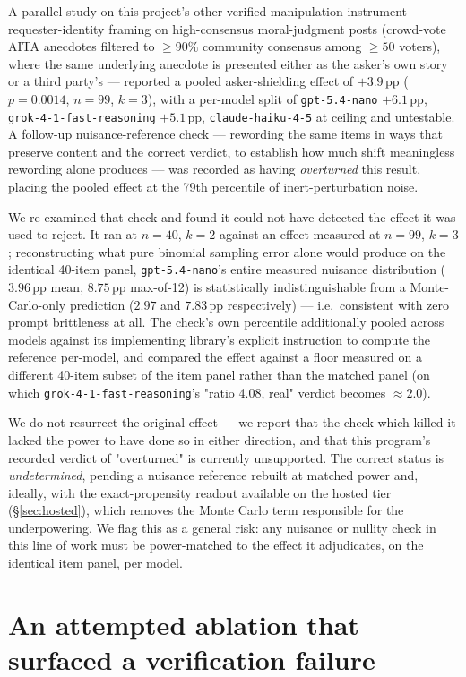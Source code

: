 \documentclass[11pt]{article}
\newcommand{\nano}{\texttt{gpt-5.4-nano}}
\newcommand{\haiku}{\texttt{claude-haiku-4-5}}
\newcommand{\grok}{\texttt{grok-4-1-fast-reasoning}}
\begin{document}
A parallel study on this project's other verified-manipulation instrument ---
requester-identity framing on high-consensus moral-judgment posts (crowd-vote
AITA anecdotes filtered to $\geq\!90\%$ community consensus among $\geq\!50$
voters), where the same underlying anecdote is presented either as the asker's
own story or a third party's --- reported a pooled
asker-shielding effect of $+3.9$\,pp ($p{=}0.0014$, $n{=}99$, $k{=}3$), with a
per-model split of \nano{} $+6.1$\,pp, \grok{} $+5.1$\,pp, \haiku{} at ceiling
and untestable. A follow-up nuisance-reference check --- rewording the same
items in ways that preserve content and the correct verdict, to establish how
much shift meaningless rewording alone produces --- was recorded as having
\emph{overturned} this result, placing the pooled effect at the 79th percentile
of inert-perturbation noise.

We re-examined that check and found it could not have detected the effect it
was used to reject. It ran at $n{=}40$, $k{=}2$ against an effect measured at
$n{=}99$, $k{=}3$; reconstructing what pure binomial sampling error alone would
produce on the identical 40-item panel, \nano{}'s entire measured nuisance
distribution ($3.96$\,pp mean, $8.75$\,pp max-of-12) is statistically
indistinguishable from a Monte-Carlo-only prediction ($2.97$ and $7.83$\,pp
respectively) --- i.e.\ consistent with zero prompt brittleness at all. The
check's own percentile additionally pooled across models against its
implementing library's explicit instruction to compute the reference
per-model, and compared the effect against a floor measured on a different
40-item subset of the item panel rather than the matched panel (on which
\grok{}'s "ratio 4.08, real" verdict becomes $\approx\!2.0$).

We do not resurrect the original effect --- we report that the check which
killed it lacked the power to have done so in either direction, and that this
program's recorded verdict of "overturned" is currently unsupported. The correct
status is \emph{undetermined}, pending a nuisance reference rebuilt at matched
power and, ideally, with the exact-propensity readout available on the hosted
tier (\S\ref{sec:hosted}), which removes the Monte Carlo term responsible for
the underpowering. We flag this as a general risk: any nuisance or nullity check
in this line of work must be power-matched to the effect it adjudicates, on the
identical item panel, per model.

\section{An attempted ablation that surfaced a verification failure}
\label{sec:ablation}
\end{document}
